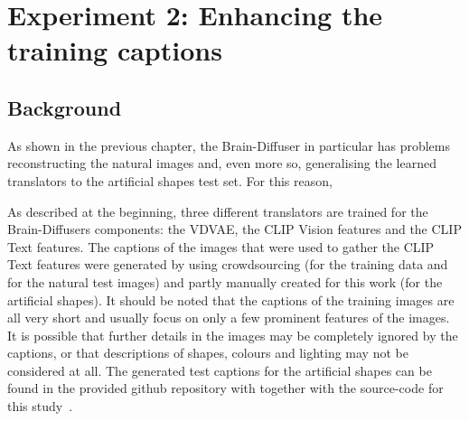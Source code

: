 \section{Experiment 2: Enhancing the training captions}

\subsection{Background}

As shown in the previous chapter, the Brain-Diffuser in particular has problems reconstructing the natural images and, even more so, generalising the learned translators to the artificial shapes test set. 
 For this reason, 

As described at the beginning, three different translators are trained for the Brain-Diffusers components: the VDVAE, the CLIP Vision features and the CLIP Text features. The captions of the images that were used to gather the CLIP Text features were generated by using crowdsourcing (for the training data and for the natural test images) and partly manually created for this work (for the artificial shapes). It should be noted that the captions of the training images are all very short and usually focus on only a few prominent features of the images. It is possible that further details in the images may be completely ignored by the captions, or that descriptions of shapes, colours and lighting may not be considered at all. The generated test captions for the artificial shapes can be found in the provided github repository with together with the source-code for this study~\cite{mildenbergerDiversity_thesis}.


